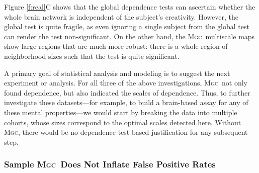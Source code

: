 \documentclass[11pt]{article}
\providecommand{\sct}[1]{{\normalfont\textsc{#1}}}
\newcommand{\Mgc}{\sct{Mgc}}
\begin{document}
Figure \ref{f:real}{\color{magenta}C} shows that the global dependence tests can ascertain whether the whole brain network is independent of the subject's creativity.  However, the global test is quite fragile, as even ignoring a single subject from the global test can render the test non-significant. On the other hand, the \Mgc~multiscale maps show large regions that are  much more robust: there is a whole region of neighborhood sizes such that the test is quite significant.  



A primary goal of statistical analysis and modeling is to suggest the next experiment or analysis.  For all three of the above investigations, \Mgc~not only found dependence, but also indicated the scales of dependence.  
Thus, to further investigate these datasets---for example, to build a brain-based assay for any of these mental properties---we would start by breaking the data into multiple cohorts, whose sizes correspond to the optimal scales detected here.  Without \Mgc, there would be no dependence test-based justification for any subsequent step.
%
%
%


\subsubsection*{Sample \Mgc~Does Not Inflate False Positive Rates} %
\end{document}
